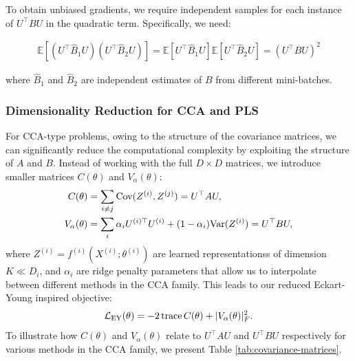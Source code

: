 To obtain unbiased gradients, we require independent samples for each instance of $U^\top B U$ in the quadratic term. Specifically, we need:

\begin{align}
\mathbb{E}[(U^\top \hat{B}_1 U)(U^\top \hat{B}_2 U)] = \mathbb{E}[U^\top \hat{B}_1 U] \mathbb{E}[U^\top \hat{B}_2 U] = (U^\top B U)^2
\end{align}

where $\hat{B}_1$ and $\hat{B}_2$ are independent estimates of $B$ from different mini-batches.

\subsubsection{Dimensionality Reduction for CCA and PLS}\label{sec:dim-reduction}
For CCA-type problems, owing  to the structure  of the covariance matrices, we can significantly reduce the computational complexity by exploiting the structure of $A$ and $B$. Instead of working with the full $D \times D$ matrices, we introduce smaller matrices $C(\theta)$ and $V_\alpha(\theta)$:
\begin{align}\label{eq:def-C-V-matrices}
C(\theta) &= \sum_{i \neq j} \mathrm{Cov}(Z^{(i)}, Z^{(j)}) = U^\top A U, \\
V_\alpha(\theta) &= \sum_i \alpha_i U^{(i)\top} U^{(i)} + (1 - \alpha_i) \mathrm{Var}(Z^{(i)}) = U^\top B U,
\end{align}
where $Z^{(i)} = f^{(i)}(X^{(i)}; \theta^{(i)})$ are learned \glspl{representations} of dimension $K \ll D_i$, and $\alpha_i$ are ridge penalty parameters that allow us to interpolate between different methods in the CCA family.
This leads to our reduced Eckart-Young inspired objective:
\begin{align}\label{eq:EY-loss-def-C-V}
\mathcal{L}_\text{EY}(\theta) = -2 \operatorname{trace} C(\theta) + |V_\alpha(\theta)|_F^2.
\end{align}
To illustrate how $C(\theta)$ and $V_\alpha(\theta)$ relate to $U^\top A U$ and $U^\top B U$ respectively for various methods in the CCA family, we present Table \ref{tab:covariance-matrices}.
